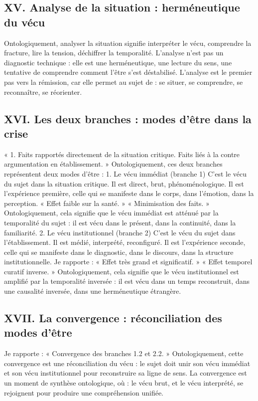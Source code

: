 \documentclass[12pt,a4paper]{article}
\begin{document}
\subsection*{XV. Analyse de la situation : herméneutique du vécu}
Ontologiquement, analyser la situation signifie interpréter le vécu, comprendre la fracture, lire la tension, déchiffrer la temporalité. L’analyse n’est pas un diagnostic technique : elle est une herméneutique, une lecture du sens, une tentative de comprendre comment l’être s’est déstabilisé.
L’analyse est le premier pas vers la rémission, car elle permet au sujet de :
	se situer,
	se comprendre,
	se reconnaître,
	se réorienter.

\subsection*{XVI. Les deux branches : modes d’être dans la crise}
« 1. Faits rapportés directement de la situation critique.
	Faits liés à la contre argumentation en établissement. »
Ontologiquement, ces deux branches représentent deux modes d’être :
1. Le vécu immédiat (branche 1)
C’est le vécu du sujet dans la situation critique. Il est direct, brut, phénoménologique. Il est l’expérience première, celle qui se manifeste dans le corps, dans l’émotion, dans la perception.
« Effet faible sur la santé. » « Minimisation des faits. »
Ontologiquement, cela signifie que le vécu immédiat est atténué par la temporalité du sujet : il est vécu dans le présent, dans la continuité, dans la familiarité.
2. Le vécu institutionnel (branche 2)
C’est le vécu du sujet dans l’établissement. Il est médié, interprété, reconfiguré. Il est l’expérience seconde, celle qui se manifeste dans le diagnostic, dans le discours, dans la structure institutionnelle.
Je rapporte :
« Effet très grand et significatif. » « Effet temporel curatif inverse. »
Ontologiquement, cela signifie que le vécu institutionnel est amplifié par la temporalité inversée : il est vécu dans un temps reconstruit, dans une causalité inversée, dans une herméneutique étrangère.

\subsection*{XVII. La convergence : réconciliation des modes d’être}
Je rapporte :
« Convergence des branches 1.2 et 2.2. »
Ontologiquement, cette convergence est une réconciliation du vécu : le sujet doit unir son vécu immédiat et son vécu institutionnel pour reconstruire sa ligne de sens.
La convergence est un moment de synthèse ontologique, où :
	le vécu brut,
	et le vécu interprété,
se rejoignent pour produire une compréhension unifiée.
\end{document}
